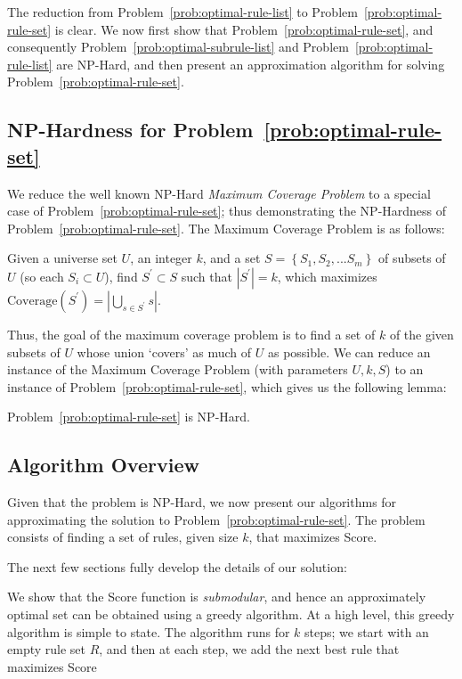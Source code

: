 \noindent The reduction from Problem~\ref{prob:optimal-rule-list} to Problem~\ref{prob:optimal-rule-set} is clear. We now first show that Problem~\ref{prob:optimal-rule-set}, and consequently Problem~\ref{prob:optimal-subrule-list} and Problem~\ref{prob:optimal-rule-list} are {\sc NP-Hard}, and then present an approximation algorithm for solving Problem~\ref{prob:optimal-rule-set}.

\subsection{NP-Hardness for Problem~\ref{prob:optimal-rule-set}}
We reduce the well known {\sc NP-Hard} {\em Maximum Coverage Problem} to a special case of Problem~\ref{prob:optimal-rule-set};
thus demonstrating the {\sc NP-Hard}ness of Problem~\ref{prob:optimal-rule-set}. The Maximum Coverage Problem is as follows: 
\begin{problem}\label{prob:maximum-coverage}
Given a universe set $U$, an integer $k$, and a set $S = \left\lbrace S_1, S_2, ... S_m \right\rbrace$ of subsets of $U$ (so each $S_i \subset U$), find $S^{\prime} \subset S$ such that $|S^{\prime}| = k$, which maximizes $\text{Coverage}(S^{\prime}) = |\bigcup_{s \in S^{\prime}} s|$.
\end{problem}
Thus, the goal of the maximum coverage problem is to find a set of $k$ of the given subsets of $U$ whose union `covers' as much of $U$ as possible. We can reduce an instance of the Maximum Coverage Problem (with parameters $U, k, S$) to an instance of Problem~\ref{prob:optimal-rule-set}, which gives us the following lemma:
\begin{lemma}
Problem~\ref{prob:optimal-rule-set} is {\sc NP-Hard}.
\end{lemma}


\subsection{Algorithm Overview}\label{sec:alg-overview}
Given that the problem is {\sc NP-Hard}, we now present our algorithms 
for approximating the solution to Problem~\ref{prob:optimal-rule-set}. 
The problem consists of finding a set of rules, given size $k$, that maximizes 
Score. 


The next few sections fully develop the
details of our solution:

\squishlist
\item We show that the Score function is {\em submodular}, and hence an approximately optimal set can be obtained using a greedy algorithm. At a high level, this greedy algorithm is simple to state. The algorithm runs for $k$ steps;
we start with an empty rule set $R$, and then at each step, we add the next best rule that maximizes Score
 
